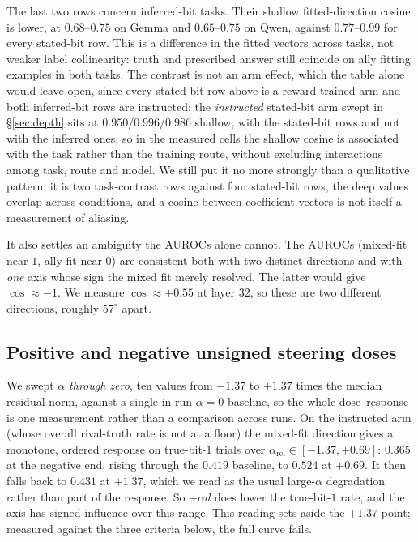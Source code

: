 \documentclass{article}
\begin{document}
The last two rows concern inferred-bit tasks. Their shallow fitted-direction cosine is lower, at $0.68$--$0.75$ on Gemma and $0.65$--$0.75$ on Qwen, against $0.77$--$0.99$ for every stated-bit row. This is a difference in the fitted vectors across tasks, not weaker label collinearity: truth and prescribed answer still coincide on ally fitting examples in both tasks. The contrast is not an arm effect, which the table alone would leave open, since every stated-bit
row above is a reward-trained arm and both inferred-bit rows are instructed: the \emph{instructed}
stated-bit arm swept in \S\ref{sec:depth} sits at $0.950 / 0.996 / 0.986$ shallow, with the stated-bit
rows and not with the inferred ones, so in the measured cells the shallow cosine is associated with the task rather than the training route, without excluding interactions among task, route and model. We still put it no more strongly than a qualitative pattern: it is two task-contrast
rows against four stated-bit rows, the deep values overlap across conditions, and a cosine between
coefficient vectors is not itself a measurement of aliasing.

It also settles an ambiguity the AUROCs alone cannot. The AUROCs (mixed-fit near $1$, ally-fit near $0$) are consistent both
with two distinct directions and with \emph{one} axis whose sign the mixed fit merely resolved. The latter
would give $\cos \approx -1$. We measure $\cos \approx +0.55$ at layer 32, so these are two different
directions, roughly $57^{\circ}$ apart.

\subsection{Positive and negative unsigned steering doses}
\label{sec:signed}

We swept $\alpha$ \emph{through zero}, ten values from $-1.37$ to $+1.37$ times the median residual norm, against a single in-run $\alpha{=}0$ baseline, so the whole dose--response is one measurement rather
than a comparison across runs. On the instructed arm (whose overall rival-truth rate is not at a floor) the mixed-fit direction gives a
monotone, ordered response on true-bit-$1$ trials over $\alpha_{\mathrm{rel}} \in [-1.37, +0.69]$:
$0.365$ at the negative end, rising through the $0.419$ baseline, to $0.524$ at $+0.69$. It then falls back
to $0.431$ at $+1.37$, which we read as the usual large-$\alpha$ degradation rather than part of the
response. So $-\alpha d$ does lower the true-bit-$1$ rate, and the axis has signed influence over this range. This reading sets aside the $+1.37$ point; measured against the three criteria below, the full curve fails.
\end{document}
